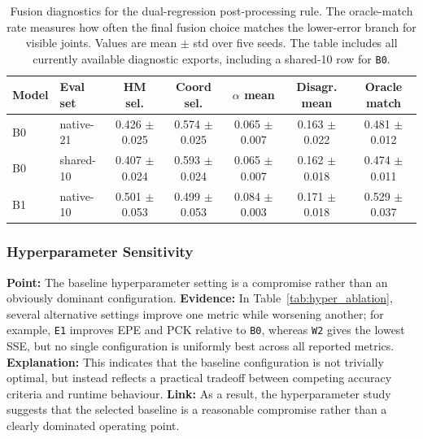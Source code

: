 \documentclass[10pt,letterpaper]{article}
\begin{document}
\begin{table}[H]
\centering
\footnotesize
\caption{Fusion diagnostics for the dual-regression post-processing rule. The oracle-match rate measures how often the final fusion choice matches the lower-error branch for visible joints. Values are mean $\pm$ std over five seeds. The table includes all currently available diagnostic exports, including a shared-10 row for \texttt{B0}.}
\label{tab:fusion_diagnostics}
\begin{tabular}{llccccc}
\toprule
Model & Eval set & HM sel. & Coord sel. & $\alpha$ mean & Disagr. mean & Oracle match \\
\midrule
B0 & native-21 & 0.426 $\pm$ 0.025 & 0.574 $\pm$ 0.025 & 0.065 $\pm$ 0.007 & 0.163 $\pm$ 0.022 & 0.481 $\pm$ 0.012 \\
B0 & shared-10 & 0.407 $\pm$ 0.024 & 0.593 $\pm$ 0.024 & 0.065 $\pm$ 0.007 & 0.162 $\pm$ 0.018 & 0.474 $\pm$ 0.011 \\
B1 & native-10 & 0.501 $\pm$ 0.053 & 0.499 $\pm$ 0.053 & 0.084 $\pm$ 0.003 & 0.171 $\pm$ 0.018 & 0.529 $\pm$ 0.037 \\
\bottomrule
\end{tabular}
\end{table}

\subsubsection{Hyperparameter Sensitivity}

\medskip
\noindent\textbf{Point:} The baseline hyperparameter setting is a compromise rather than an obviously dominant configuration.  
\textbf{Evidence:} In Table~\ref{tab:hyper_ablation}, several alternative settings improve one metric while worsening another; for example, \texttt{E1} improves EPE and PCK relative to \texttt{B0}, whereas \texttt{W2} gives the lowest SSE, but no single configuration is uniformly best across all reported metrics.  
\textbf{Explanation:} This indicates that the baseline configuration is not trivially optimal, but instead reflects a practical tradeoff between competing accuracy criteria and runtime behaviour.  
\textbf{Link:} As a result, the hyperparameter study suggests that the selected baseline is a reasonable compromise rather than a clearly dominated operating point.
\end{document}
